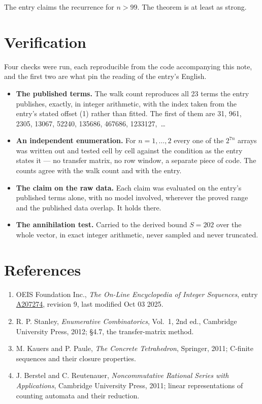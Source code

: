 \documentclass[11pt]{article}
\theoremstyle{definition}
\begin{document}
The entry claims the recurrence for $n > 99$. The theorem is at least as strong.

\section{Verification}

Four checks were run, each reproducible from the code accompanying this note, and the first two are what pin the reading of the entry's English.

\begin{itemize}

\item {\bfseries The published terms.} The walk count reproduces all 23 terms the entry publishes, exactly, in integer arithmetic, with the index taken from the entry's stated offset (1) rather than fitted. The first of them are 31, 961, 2305, 13067, 52240, 135686, 467686, 1233127,~\dots

\item {\bfseries An independent enumeration.} For $n = 1,\dots,2$ every one of the $2^{7n}$ arrays was written out and tested cell by cell against the condition as the entry states it --- no transfer matrix, no row window, a separate piece of code. The counts agree with the walk count and with the entry.

\item {\bfseries The claim on the raw data.} Each claim was evaluated on the entry's published terms alone, with no model involved, wherever the proved range and the published data overlap. It holds there.

\item {\bfseries The annihilation test.} Carried to the derived bound $S = 202$ over the whole vector, in exact integer arithmetic, never sampled and never truncated.

\end{itemize}

\section{References}

\begin{enumerate}

\item OEIS Foundation Inc., \emph{The On-Line Encyclopedia of Integer Sequences}, entry \href{https://oeis.org/A207274}{A207274}, revision 9, last modified Oct 03 2025.

\item R. P. Stanley, \emph{Enumerative Combinatorics}, Vol.~1, 2nd ed., Cambridge University Press, 2012; \S4.7, the transfer-matrix method.

\item M. Kauers and P. Paule, \emph{The Concrete Tetrahedron}, Springer, 2011; C-finite sequences and their closure properties.

\item J. Berstel and C. Reutenauer, \emph{Noncommutative Rational Series with Applications}, Cambridge University Press, 2011; linear representations of counting automata and their reduction.

\end{enumerate}
\end{document}
